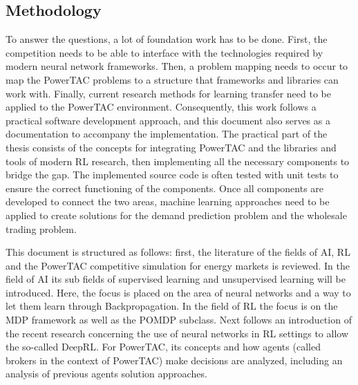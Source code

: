 \subsection{Methodology}
\label{sec:methodology}
To answer the questions, a lot of foundation work has to be done. First, the competition needs to be able to interface
with the technologies required by modern neural network frameworks. Then,  a problem mapping needs to occur to map the
\ac{PowerTAC} problems to a structure that frameworks and libraries can work with. Finally, current research methods for
learning transfer need to be applied to the \ac{PowerTAC} environment. Consequently, this work follows a practical
software development approach, and this document also serves as a documentation to accompany the implementation. The
practical part of the thesis consists of the concepts for integrating \ac{PowerTAC} and the libraries and tools of
modern \ac{RL} research, then implementing all the necessary components to bridge the gap. The implemented source code is
often tested with unit tests to ensure the correct functioning of the components. Once all components are
developed to connect the two areas, machine learning approaches need to be applied to create solutions for the demand
prediction problem and the wholesale trading problem.

This document is structured as follows: first, the literature of the fields of \ac{AI}, \ac{RL} and the \ac{PowerTAC}
competitive simulation for energy markets is reviewed. In the field of AI its sub fields of supervised learning and
unsupervised learning will be introduced. Here, the focus is placed on the area of neural networks and a way to let them
learn through Backpropagation. In the field of \ac{RL} the focus is on the \ac{MDP} framework as well as the \ac{POMDP}
subclass.  Next follows an introduction of the recent research concerning the use of neural networks in \ac{RL} settings
to allow the so-called \ac{DeepRL}. For \ac{PowerTAC}, its concepts and how agents (called brokers in the
context of \ac{PowerTAC}) make decisions are analyzed, including an analysis of previous agents solution approaches.


